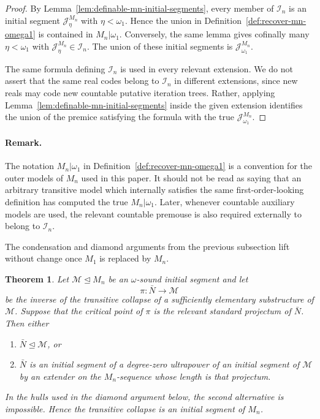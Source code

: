 \documentclass[a4paper,11pt]{article}
\newtheorem{theorem}{Theorem}[section]
\begin{document}
\begin{proof}
By Lemma~\ref{lem:definable-mn-initial-segments}, every member of $\mathcal I_n$ is an initial segment $\mathcal J^{M_n}_\eta$ with $\eta<\omega_1$.  Hence the union in Definition~\ref{def:recover-mn-omega1} is contained in $M_n|\omega_1$.  Conversely, the same lemma gives cofinally many $\eta<\omega_1$ with $\mathcal J^{M_n}_\eta\in\mathcal I_n$.  The union of these initial segments is $\mathcal J^{M_n}_{\omega_1}$.

The same formula defining $\mathcal I_n$ is used in every relevant extension.  We do not assert that the same real codes belong to $\mathcal I_n$ in different extensions, since new reals may code new countable putative iteration trees.  Rather, applying Lemma~\ref{lem:definable-mn-initial-segments} inside the given extension identifies the union of the premice satisfying the formula with the true $\mathcal J^{M_n}_{\omega_1}$.
\end{proof}

\paragraph{Remark.}\label{rem:mn-omega1-not-absolute}
The notation $M_n|\omega_1$ in Definition~\ref{def:recover-mn-omega1} is a convention for the outer models of $M_n$ used in this paper.  It should not be read as saying that an arbitrary transitive model which internally satisfies the same first-order-looking definition has computed the true $M_n|\omega_1$.  Later, whenever countable auxiliary models are used, the relevant countable premouse is also required externally to belong to $\mathcal I_n$.

The condensation and diamond arguments from the previous subsection lift without change once $M_1$ is replaced by $M_n$.

\begin{theorem}\label{thm:steel-condensation-mn}
Let $\mathcal M\trianglelefteq M_n$ be an $\omega$-sound initial segment and let
\[
   \pi:\bar N\rightarrow\mathcal M
\]
be the inverse of the transitive collapse of a sufficiently elementary substructure of $\mathcal M$.  Suppose that the critical point of $\pi$ is the relevant standard projectum of $\bar N$.  Then either
\begin{enumerate}
   \item $\bar N\trianglelefteq\mathcal M$, or
   \item $\bar N$ is an initial segment of a degree-zero ultrapower of an initial segment of $\mathcal M$ by an extender on the $M_n$-sequence whose length is that projectum.
\end{enumerate}
In the hulls used in the diamond argument below, the second alternative is impossible.  Hence the transitive collapse is an initial segment of $M_n$.
\end{theorem}
\end{document}
